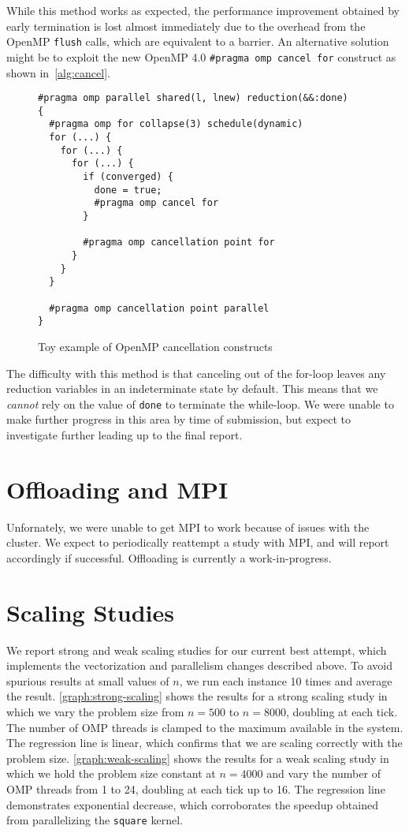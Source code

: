 \documentclass{scrartcl}
\begin{document}
  While this method works as expected, the performance improvement obtained by early termination is lost almost immediately due to the overhead from the OpenMP \texttt{flush} calls, which are equivalent to a barrier. An alternative solution might be to exploit the new OpenMP 4.0 \texttt{\#pragma omp cancel for} construct as shown in~\autoref{alg:cancel}.
  \begin{figure}[ht!]
    \begin{lstlisting}
#pragma omp parallel shared(l, lnew) reduction(&&:done)
{
  #pragma omp for collapse(3) schedule(dynamic)
  for (...) {
    for (...) {
      for (...) {
        if (converged) {
          done = true;
          #pragma omp cancel for
        }

        #pragma omp cancellation point for
      }
    }
  }

  #pragma omp cancellation point parallel
}
    \end{lstlisting}
    \caption{Toy example of OpenMP cancellation constructs\label{alg:cancel}}
  \end{figure}

  The difficulty with this method is that canceling out of the for-loop leaves any reduction variables in an indeterminate state by default. This means that we \emph{cannot} rely on the value of \texttt{done} to terminate the while-loop. We were unable to make further progress in this area by time of submission, but expect to investigate further leading up to the final report.

  \section{Offloading and MPI}
  Unfornately, we were unable to get MPI to work because of issues with the cluster. We expect to periodically reattempt a study with MPI, and will report accordingly if successful. Offloading is currently a work-in-progress.

  \section{Scaling Studies}
  We report strong and weak scaling studies for our current best attempt, which implements the vectorization and parallelism changes described above. To avoid spurious results at small values of $n$, we run each instance 10 times and average the result. \autoref{graph:strong-scaling} shows the results for a strong scaling study in which we vary the problem size from $n = 500$ to $n = 8000$, doubling at each tick. The number of OMP threads is clamped to the maximum available in the system. The regression line is linear, which confirms that we are scaling correctly with the problem size. \autoref{graph:weak-scaling} shows the results for a weak scaling study in which we hold the problem size constant at $n = 4000$ and vary the number of OMP threads from 1 to 24, doubling at each tick up to 16. The regression line demonstrates exponential decrease, which corroborates the speedup obtained from parallelizing the \texttt{square} kernel.
\end{document}
